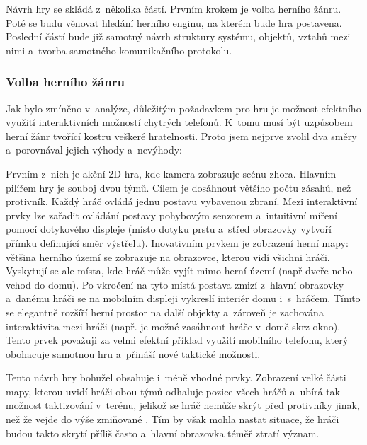 \documentclass[thesis=B,czech,hidelinks]{FITthesis}[2012/06/26] %
\begin{document}
Návrh hry se skládá z~několika částí. Prvním krokem je volba herního žánru. Poté se budu věnovat hledání herního enginu, na kterém bude hra postavena. Poslední částí bude již samotný návrh struktury systému, objektů, vztahů mezi nimi a~tvorba samotného komunikačního protokolu.

\subsubsection{Volba herního žánru}

Jak bylo zmíněno v~analýze, důležitým požadavkem pro hru je možnost efektního využití interaktivních možností chytrých telefonů. K~tomu musí být uzpůsobem herní žánr tvořící kostru veškeré hratelnosti. Proto jsem nejprve zvolil dva směry a~porovnával jejich výhody a~nevýhody:

Prvním z~nich je akční 2D hra, kde kamera zobrazuje scénu zhora. Hlavním pilířem hry je souboj dvou týmů. Cílem je dosáhnout většího počtu zásahů, než protivník. Každý hráč ovládá jednu postavu vybavenou zbraní. Mezi interaktivní prvky lze zařadit ovládání postavy pohybovým senzorem a~intuitivní míření pomocí dotykového displeje (místo dotyku prstu a~střed obrazovky vytvoří přímku definující směr výstřelu). Inovativním prvkem je zobrazení herní mapy: většina herního území se zobrazuje na obrazovce, kterou vidí všichni hráči. Vyskytují se ale místa, kde hráč může vyjít mimo herní území (např dveře nebo vchod do domu). Po vkročení na tyto místá postava zmizí z~hlavní obrazovky a~danému hráči se na mobilním displeji vykreslí interiér domu i~s~hráčem. Tímto se elegantně rozšíří herní prostor na další objekty a~zároveň je zachována interaktivita mezi hráči (např. je možné zasáhnout hráče v~domě skrz okno). Tento prvek považuji za velmi efektní příklad využití mobilního telefonu, který obohacuje samotnou hru a~přináší nové taktické možnosti.

Tento návrh hry bohužel obsahuje i~méně vhodné prvky. Zobrazení velké části mapy, kterou uvidí hráči obou týmů odhaluje pozice všech hráčů a~ubírá tak možnost taktizování v~terénu, jelikož se hráč nemůže skrýt před protivníky jinak, než že vejde do výše zmiňované . Tím by však mohla nastat situace, že hráči budou takto skrytí příliš často a~hlavní obrazovka téměř ztratí význam.
\end{document}
